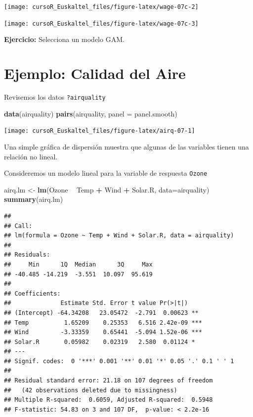\documentclass[]{book}
\newenvironment{Shaded}{\begin{snugshade}}{\end{snugshade}}
\newcommand{\KeywordTok}[1]{\textcolor[rgb]{0.13,0.29,0.53}{\textbf{#1}}}
\newcommand{\DataTypeTok}[1]{\textcolor[rgb]{0.13,0.29,0.53}{#1}}
\newcommand{\StringTok}[1]{\textcolor[rgb]{0.31,0.60,0.02}{#1}}
\newcommand{\OperatorTok}[1]{\textcolor[rgb]{0.81,0.36,0.00}{\textbf{#1}}}
\newcommand{\NormalTok}[1]{#1}
\begin{document}
\begin{center}\texttt{[image: cursoR\_Euskaltel\_files/figure-latex/wage-07c-2]} \end{center}

\begin{center}\texttt{[image: cursoR\_Euskaltel\_files/figure-latex/wage-07c-3]} \end{center}

\textbf{Ejercicio:} Selecciona un modelo GAM.

\section{Ejemplo: Calidad del Aire}\label{ejemplo-calidad-del-aire}

Revisemos los datos \texttt{?airquality}

\begin{Shaded}
\begin{Highlighting}[]
\KeywordTok{data}\NormalTok{(airquality)}
\KeywordTok{pairs}\NormalTok{(airquality, }\DataTypeTok{panel =}\NormalTok{ panel.smooth)}
\end{Highlighting}
\end{Shaded}

\begin{center}\texttt{[image: cursoR\_Euskaltel\_files/figure-latex/airq-07-1]} \end{center}

Una simple gráfica de dispersión muestra que algunas de las variables
tienen una relación no lineal.

Consideremos un modelo lineal para la variable de respuesta
\texttt{Ozone}

\begin{Shaded}
\begin{Highlighting}[]
\NormalTok{airq.lm <-}\StringTok{ }\KeywordTok{lm}\NormalTok{(Ozone }\OperatorTok{~}\StringTok{ }\NormalTok{Temp }\OperatorTok{+}\StringTok{ }\NormalTok{Wind }\OperatorTok{+}\StringTok{ }\NormalTok{Solar.R, }\DataTypeTok{data=}\NormalTok{airquality)}
\KeywordTok{summary}\NormalTok{(airq.lm)}
\end{Highlighting}
\end{Shaded}

\begin{verbatim}
## 
## Call:
## lm(formula = Ozone ~ Temp + Wind + Solar.R, data = airquality)
## 
## Residuals:
##     Min      1Q  Median      3Q     Max 
## -40.485 -14.219  -3.551  10.097  95.619 
## 
## Coefficients:
##              Estimate Std. Error t value Pr(>|t|)    
## (Intercept) -64.34208   23.05472  -2.791  0.00623 ** 
## Temp          1.65209    0.25353   6.516 2.42e-09 ***
## Wind         -3.33359    0.65441  -5.094 1.52e-06 ***
## Solar.R       0.05982    0.02319   2.580  0.01124 *  
## ---
## Signif. codes:  0 '***' 0.001 '**' 0.01 '*' 0.05 '.' 0.1 ' ' 1
## 
## Residual standard error: 21.18 on 107 degrees of freedom
##   (42 observations deleted due to missingness)
## Multiple R-squared:  0.6059, Adjusted R-squared:  0.5948 
## F-statistic: 54.83 on 3 and 107 DF,  p-value: < 2.2e-16
\end{verbatim}
\end{document}
